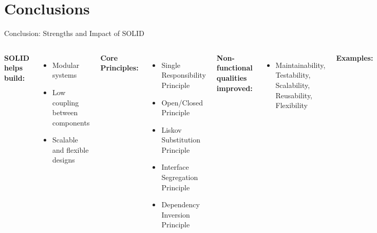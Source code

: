 \documentclass[aspectratio=169, table]{beamer}
\begin{document}
\section{Conclusions}

\begin{frame}[fragile]{Conclusion: Strengths and Impact of SOLID}
	\vspace{20pt}
	\begin{columns}[T]
		\textbf{SOLID helps build:}
		\begin{itemize}
			\item Modular systems
			\item Low coupling between components
			\item Scalable and flexible designs
		\end{itemize}
		
		\textbf{Core Principles:}
		\begin{itemize}
			\item Single Responsibility Principle
			\item Open/Closed Principle
			\item Liskov Substitution Principle
			\item Interface Segregation Principle
			\item Dependency Inversion Principle
		\end{itemize}
		
		\textbf{Non-functional qualities improved:}
		\begin{itemize}
			\item Maintainability, Testability, Scalability, Reusability, Flexibility
		\end{itemize}
		
		\textbf{Examples:}
		\begin{itemize}
			\item Interface Segregation reduces side effects
			\item Open/Closed allows safe extension
			\item Dependency Inversion enables mock injection
		\end{itemize}
		\textbf{Key Benefits: Stable architecture with consistent behaviour}
	\end{columns}
\end{frame}
\end{document}
